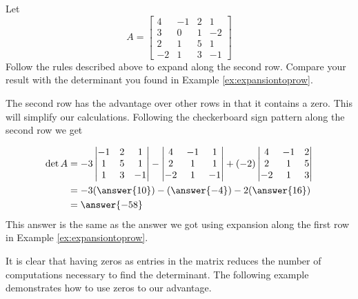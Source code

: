 \documentclass{ximera}
\begin{document}
 \begin{example}\label{ex:laplace1}
Let  
$$A=\begin{bmatrix}4&-1&2&1\\3&0&1&-2\\
2&1&5&1\\-2&1&3&-1\end{bmatrix}$$
Follow the rules described above to expand along the second row.  Compare your result with the determinant you found in Example \ref{ex:expansiontoprow}.
\begin{explanation}

 The second row has the advantage over other rows in that it contains a zero.  This will simplify our calculations.  Following the checkerboard sign pattern along the second row we get

\begin{align*}
\det{A}
&=-3\begin{vmatrix}-1&2&1\\1&5&1\\1&3&-1\end{vmatrix}-\begin{vmatrix}4&-1&1\\2&1&1\\-2&1&-1\end{vmatrix}+(-2)\begin{vmatrix}4&-1&2\\2&1&5\\-2&1&3\end{vmatrix}\\&=-3(\answer{10})-(\answer{-4})-2(\answer{16})\\
&=\answer{-58}
\end{align*}
This answer is the same as the answer we got using expansion along the first row in Example \ref{ex:expansiontoprow}.
    
\end{explanation}
 \end{example}
 
It is clear that having zeros as entries in the matrix reduces the number of computations necessary to find the determinant.  The following example demonstrates how to use zeros to our advantage.
\end{document}

